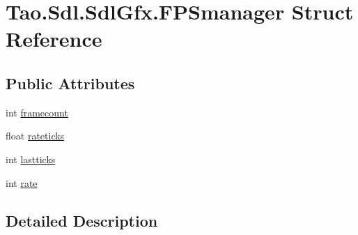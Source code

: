 \hypertarget{struct_tao_1_1_sdl_1_1_sdl_gfx_1_1_f_p_smanager}{
\section{Tao.Sdl.SdlGfx.FPSmanager Struct Reference}
\label{struct_tao_1_1_sdl_1_1_sdl_gfx_1_1_f_p_smanager}
}
\subsection*{Public Attributes}
\begin{DoxyCompactItemize}
\item 
int \hyperlink{struct_tao_1_1_sdl_1_1_sdl_gfx_1_1_f_p_smanager_a2954dc27ca4fe6eb0a532879a3a58643}{framecount}
\item 
float \hyperlink{struct_tao_1_1_sdl_1_1_sdl_gfx_1_1_f_p_smanager_aaa1ed4359758e556829ada4121383b79}{rateticks}
\item 
int \hyperlink{struct_tao_1_1_sdl_1_1_sdl_gfx_1_1_f_p_smanager_a562cc66fe8d9779b97cb21a54656a846}{lastticks}
\item 
int \hyperlink{struct_tao_1_1_sdl_1_1_sdl_gfx_1_1_f_p_smanager_af9664223888e7aa1ce2f54469c630b13}{rate}
\end{DoxyCompactItemize}


\subsection{Detailed Description}


